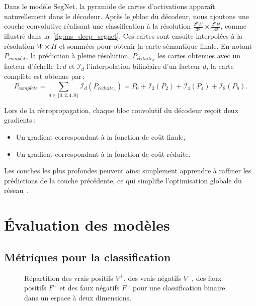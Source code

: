 Dans le modèle SegNet, la pyramide de cartes d'activations apparaît naturellement dans le décodeur. Après le $p$\ieme bloc du décodeur, nous ajoutons une couche convolutive réalisant une classification à la résolution $\frac{2^p W}{32} \times \frac{2^p H}{32}$, comme illustré dans la~\cref{fig:ms_deep_segnet}. Ces cartes sont ensuite interpolées à la résolution $W\times H$ et sommées pour obtenir la carte sémantique finale. En notant $P_{\mathit{compl\grave{e}te}}$ la prédiction à pleine résolution, $P_{\mathit{r\acute{e}duite}_d}$ les cartes obtenues avec un facteur d'échelle $1:d$ et $\mathcal{I}_d$ l'interpolation bilinéaire d'un facteur $d$, la carte complète est obtenue par\,:
\begin{equation}
P_{\mathit{compl\grave{e}te}} = \sum_{d \in \{0, 2, 4, 8\}} \mathcal{I}_d(P_{\mathit{r\acute{e}duite}_d}) = P_0 + \mathcal{I}_2(P_2) + \mathcal{I}_4(P_4) + \mathcal{I}_8(P_8).
\end{equation}

Lors de la rétropropagation, chaque bloc convolutif du décodeur reçoit deux gradients\,:
\begin{itemize}
	\item Un gradient correspondant à la fonction de coût finale,
  \item Un gradient correspondant à la fonction de coût réduite.
\end{itemize}
Les couches les plus profondes peuvent ainsi simplement apprendre à raffiner les prédictions de la couche précédente, ce qui simplifie l'optimisation globale du réseau~\cite{lin_refinenet_2016}.

\section{Évaluation des modèles}

\subsection{Métriques pour la classification}

\def\tp{V^+}
\def\tn{V^-}
\def\fp{F^+}
\def\fn{F^-}

\begin{figure}
	\resizebox{\textwidth}{!}{%
	
	}
	\caption{Répartition des vrais positifs $\tp$, des vrais négatifs $\tn$, des faux positifs $\fp$ et des faux négatifs $\fn$ pour une classification binaire dans un espace à deux dimensions.}
	\label{fig:classification_binaire}
\end{figure}

